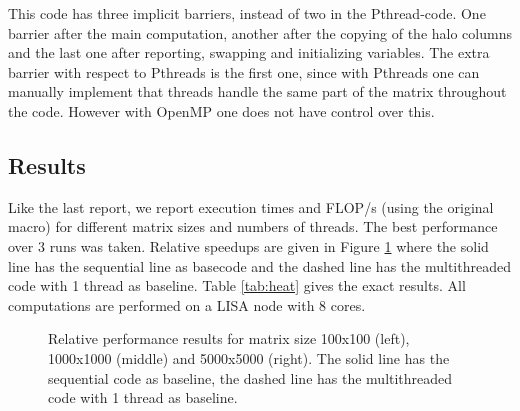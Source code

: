 \documentclass[11pt,a4paper,onecolumn]{article}
\begin{document}
This code has three implicit barriers, instead of two in the Pthread-code. One barrier after the main computation, another after the copying of the halo columns and the last one after reporting, swapping and initializing variables. The extra barrier with respect to Pthreads is the first one, since with Pthreads one can manually implement that threads handle the same part of the matrix throughout the code. However with OpenMP one does not have control over this.

\subsection{Results}
Like the last report, we report execution times and FLOP/s (using the original macro) for different matrix sizes and numbers of threads. The best performance over 3 runs was taken. Relative speedups are given in Figure \ref{fig:heat} where the solid line has the sequential line as basecode and the dashed line has the multithreaded code with 1 thread as baseline. Table \ref{tab:heat} gives the exact results. All computations are performed on a LISA node with 8 cores.

\begin{figure}[H]
  \centering
  \caption{Relative performance results for matrix size 100x100 (left), 1000x1000 (middle) and 5000x5000 (right). The solid line has the sequential code as baseline, the dashed line has the multithreaded code with 1 thread as baseline.}
  \label{fig:heat}
\end{figure}
\end{document}
